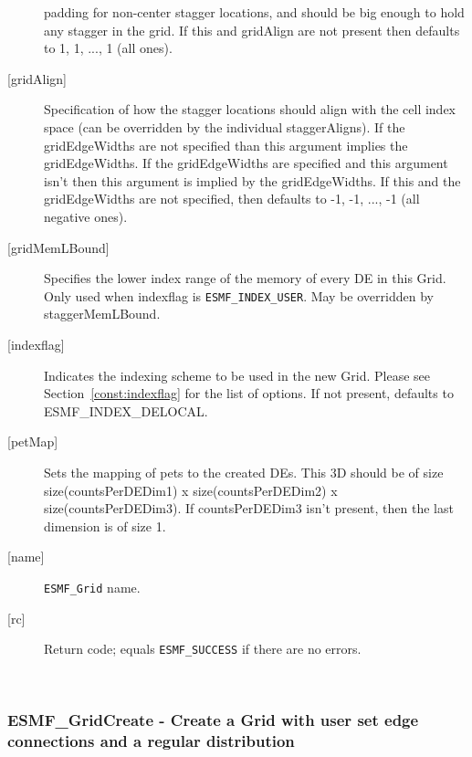 \begin{description}
        padding for non-center stagger locations, and should be big enough
        to hold any stagger in the grid. If this and gridAlign are not present then
        defaults to 1, 1, ..., 1 (all ones).
   \item[{[gridAlign]}]
       Specification of how the stagger locations should align with the cell
       index space (can be overridden by the individual staggerAligns). If
       the gridEdgeWidths are not specified than this argument
       implies the gridEdgeWidths. If the gridEdgeWidths are specified and this argument isn't
       then this argument is implied by the gridEdgeWidths.
       If this and the gridEdgeWidths are not specified, then defaults to
      -1, -1, ..., -1 (all negative ones).
   \item[{[gridMemLBound]}]
        Specifies the lower index range of the memory of every DE in this Grid.
        Only used when indexflag is {\tt ESMF\_INDEX\_USER}. May be overridden
        by staggerMemLBound.
   \item[{[indexflag]}]
        Indicates the indexing scheme to be used in the new Grid. Please see
        Section~\ref{const:indexflag} for the list of options. If not present,
        defaults to ESMF\_INDEX\_DELOCAL.
   \item[{[petMap]}]
         \begin{sloppypar}
         Sets the mapping of pets to the created DEs. This 3D
         should be of size size(countsPerDEDim1) x size(countsPerDEDim2) x
         size(countsPerDEDim3). If countsPerDEDim3 isn't present, then
         the last dimension is of size 1.
         \end{sloppypar}
   \item[{[name]}]
            {\tt ESMF\_Grid} name.
   \item[{[rc]}]
        Return code; equals {\tt ESMF\_SUCCESS} if there are no errors.
   \end{description}
   
 
\mbox{}\hrulefill\ 
 
\subsubsection [ESMF\_GridCreate] {ESMF\_GridCreate - Create a Grid with user set edge connections and a regular distribution}


